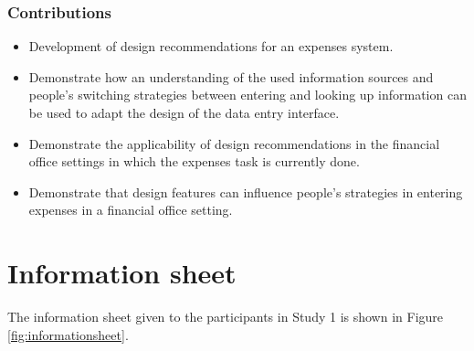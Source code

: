 \documentclass[11pt,oneside]{report}
\begin{document}
\begin{table}
\subsection{Contributions}
\begin{itemize}
\item
Development of design recommendations for an expenses system.
\item
Demonstrate how an understanding of the used information sources and people's switching strategies between entering and looking up information can be used to adapt the design of the data entry interface. 
\item
Demonstrate the applicability of design recommendations in the financial office settings in which the expenses task is currently done. 
\item
Demonstrate that design features can influence people's strategies in entering expenses in a financial office setting.
\end{itemize}




\appendix\label{ch:appendix}
\chapter{Information sheet}\label{ch:information_sheet}
The information sheet given to the participants in Study 1 is shown in Figure \ref{fig:informationsheet}. 


\end{table}
\end{document}
